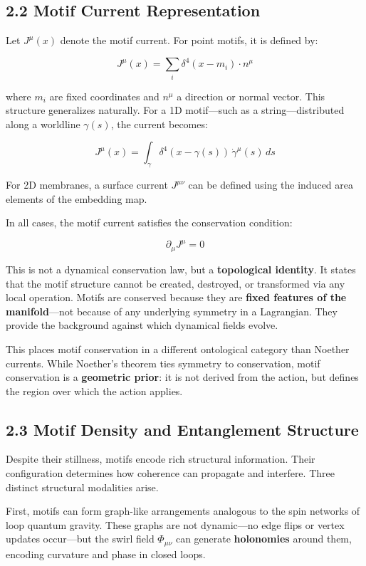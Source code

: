 \documentclass[
  11pt,
]{article}
\begin{document}
\subsection{2.2 Motif Current
Representation}\label{motif-current-representation}

Let \(J^\mu(x)\) denote the motif current. For point motifs, it is
defined by:

\[
J^\mu(x) = \sum_i \delta^4(x - m_i) \cdot n^\mu
\]

where \(m_i\) are fixed coordinates and \(n^\mu\) a direction or normal
vector. This structure generalizes naturally. For a 1D motif---such as a
string---distributed along a worldline \(\gamma(s)\), the current
becomes:

\[
J^\mu(x) = \int_{\gamma} \delta^4(x - \gamma(s)) \, \dot{\gamma}^\mu(s) \, ds
\]

For 2D membranes, a surface current \(J^{\mu\nu}\) can be defined using
the induced area elements of the embedding map.

In all cases, the motif current satisfies the conservation condition:

\[
\partial_\mu J^\mu = 0
\]

This is not a dynamical conservation law, but a \textbf{topological
identity}. It states that the motif structure cannot be created,
destroyed, or transformed via any local operation. Motifs are conserved
because they are \textbf{fixed features of the manifold}---not because
of any underlying symmetry in a Lagrangian. They provide the background
against which dynamical fields evolve.

This places motif conservation in a different ontological category than
Noether currents. While Noether's theorem ties symmetry to conservation,
motif conservation is a \textbf{geometric prior}: it is not derived from
the action, but defines the region over which the action applies.

\subsection{2.3 Motif Density and Entanglement
Structure}\label{motif-density-and-entanglement-structure}

Despite their stillness, motifs encode rich structural information.
Their configuration determines how coherence can propagate and
interfere. Three distinct structural modalities arise.

First, motifs can form graph-like arrangements analogous to the spin
networks of loop quantum gravity. These graphs are not dynamic---no edge
flips or vertex updates occur---but the swirl field \(\Phi_{\mu\nu}\)
can generate \textbf{holonomies} around them, encoding curvature and
phase in closed loops.
\end{document}
